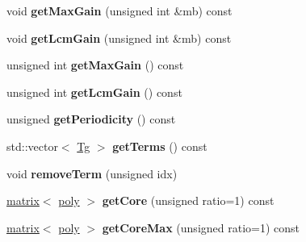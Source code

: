 \begin{DoxyCompactItemize}
\mbox{\label{classetvo_i_i_1_1poly_tg_a59d6ac1f74cb08d2f1076e51fe11491d}} 
void {\bfseries get\+Max\+Gain} (unsigned int \&mb) const
\item 
\mbox{\label{classetvo_i_i_1_1poly_tg_a0d0cdba224e873357e2da17da883c95f}} 
void {\bfseries get\+Lcm\+Gain} (unsigned int \&mb) const
\item 
\mbox{\label{classetvo_i_i_1_1poly_tg_a4bfec05f9b189aa2942bdb575b53351d}} 
unsigned int {\bfseries get\+Max\+Gain} () const
\item 
\mbox{\label{classetvo_i_i_1_1poly_tg_a4de56328e83b821cc0f0041c7b31a405}} 
unsigned int {\bfseries get\+Lcm\+Gain} () const
\item 
\mbox{\label{classetvo_i_i_1_1poly_tg_ad105b9223b1edae79b89c51c73fe98f1}} 
unsigned {\bfseries get\+Periodicity} () const
\item 
\mbox{\label{classetvo_i_i_1_1poly_tg_a3b606730404c4e887cad5092998b8162}} 
std\+::vector$<$ \mbox{\hyperlink{classetvo_i_i_1_1_tg}{Tg}} $>$ {\bfseries get\+Terms} () const
\item 
\mbox{\label{classetvo_i_i_1_1poly_tg_ab7a34bc66bc3a2dbd76fba0084f9bbdb}} 
void {\bfseries remove\+Term} (unsigned idx)
\item 
\mbox{\label{classetvo_i_i_1_1poly_tg_ab4ff23a26ac7621c410119cf248e2699}} 
\mbox{\hyperlink{classetvo_i_i_1_1matrix}{matrix}}$<$ \mbox{\hyperlink{classetvo_i_i_1_1poly}{poly}} $>$ {\bfseries get\+Core} (unsigned ratio=1) const
\item 
\mbox{\label{classetvo_i_i_1_1poly_tg_aecd2bb7d9b39b30b620ca634acd37bf6}} 
\mbox{\hyperlink{classetvo_i_i_1_1matrix}{matrix}}$<$ \mbox{\hyperlink{classetvo_i_i_1_1poly}{poly}} $>$ {\bfseries get\+Core\+Max} (unsigned ratio=1) const
\end{DoxyCompactItemize}

